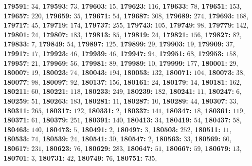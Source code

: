 \textsf{\bfseries 179591:} $34$, \textsf{\bfseries 179593:} $73$, \textsf{\bfseries 179603:} $15$, \textsf{\bfseries 179623:} $116$, \textsf{\bfseries 179633:} $78$, \textsf{\bfseries 179651:} $153$, \textsf{\bfseries 179657:} $220$, \textsf{\bfseries 179659:} $35$, \textsf{\bfseries 179671:} $54$, \textsf{\bfseries 179687:} $308$, \textsf{\bfseries 179689:} $274$, \textsf{\bfseries 179693:} $168$, \textsf{\bfseries 179717:} $45$, \textsf{\bfseries 179719:} $174$, \textsf{\bfseries 179737:} $255$, \textsf{\bfseries 179743:} $105$, \textsf{\bfseries 179749:} $98$, \textsf{\bfseries 179779:} $142$, \textsf{\bfseries 179801:} $24$, \textsf{\bfseries 179807:} $183$, \textsf{\bfseries 179813:} $85$, \textsf{\bfseries 179819:} $24$, \textsf{\bfseries 179821:} $156$, \textsf{\bfseries 179827:} $82$, \textsf{\bfseries 179833:} $7$, \textsf{\bfseries 179849:} $54$, \textsf{\bfseries 179897:} $125$, \textsf{\bfseries 179899:} $29$, \textsf{\bfseries 179903:} $19$, \textsf{\bfseries 179909:} $37$, \textsf{\bfseries 179917:} $17$, \textsf{\bfseries 179923:} $46$, \textsf{\bfseries 179939:} $46$, \textsf{\bfseries 179947:} $94$, \textsf{\bfseries 179951:} $68$, \textsf{\bfseries 179953:} $158$, \textsf{\bfseries 179957:} $21$, \textsf{\bfseries 179969:} $56$, \textsf{\bfseries 179981:} $89$, \textsf{\bfseries 179989:} $10$, \textsf{\bfseries 179999:} $177$, \textsf{\bfseries 180001:} $29$, \textsf{\bfseries 180007:} $19$, \textsf{\bfseries 180023:} $74$, \textsf{\bfseries 180043:} $194$, \textsf{\bfseries 180053:} $132$, \textsf{\bfseries 180071:} $104$, \textsf{\bfseries 180073:} $38$, \textsf{\bfseries 180077:} $98$, \textsf{\bfseries 180097:} $92$, \textsf{\bfseries 180137:} $156$, \textsf{\bfseries 180161:} $24$, \textsf{\bfseries 180179:} $14$, \textsf{\bfseries 180181:} $162$, \textsf{\bfseries 180211:} $60$, \textsf{\bfseries 180221:} $118$, \textsf{\bfseries 180233:} $249$, \textsf{\bfseries 180239:} $182$, \textsf{\bfseries 180241:} $11$, \textsf{\bfseries 180247:} $6$, \textsf{\bfseries 180259:} $51$, \textsf{\bfseries 180263:} $183$, \textsf{\bfseries 180281:} $11$, \textsf{\bfseries 180287:} $10$, \textsf{\bfseries 180289:} $44$, \textsf{\bfseries 180307:} $33$, \textsf{\bfseries 180311:} $265$, \textsf{\bfseries 180317:} $122$, \textsf{\bfseries 180331:} $2$, \textsf{\bfseries 180337:} $141$, \textsf{\bfseries 180347:} $18$, \textsf{\bfseries 180361:} $119$, \textsf{\bfseries 180371:} $61$, \textsf{\bfseries 180379:} $251$, \textsf{\bfseries 180391:} $140$, \textsf{\bfseries 180413:} $34$, \textsf{\bfseries 180419:} $54$, \textsf{\bfseries 180437:} $58$, \textsf{\bfseries 180463:} $140$, \textsf{\bfseries 180473:} $5$, \textsf{\bfseries 180491:} $2$, \textsf{\bfseries 180497:} $3$, \textsf{\bfseries 180503:} $252$, \textsf{\bfseries 180511:} $11$, \textsf{\bfseries 180533:} $74$, \textsf{\bfseries 180539:} $24$, \textsf{\bfseries 180541:} $30$, \textsf{\bfseries 180547:} $2$, \textsf{\bfseries 180563:} $33$, \textsf{\bfseries 180569:} $60$, \textsf{\bfseries 180617:} $231$, \textsf{\bfseries 180623:} $76$, \textsf{\bfseries 180629:} $283$, \textsf{\bfseries 180647:} $51$, \textsf{\bfseries 180667:} $59$, \textsf{\bfseries 180679:} $13$, \textsf{\bfseries 180701:} $3$, \textsf{\bfseries 180731:} $42$, \textsf{\bfseries 180749:} $76$, \textsf{\bfseries 180751:} $735$, 
